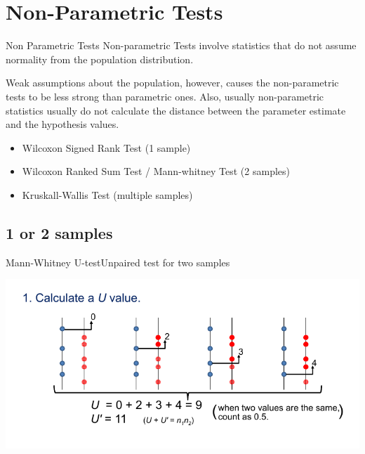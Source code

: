 \section{Non-Parametric Tests}

\begin{frame}{Non Parametric Tests}{}
  Non-parametric Tests involve statistics that do not assume normality from the population distribution.\bigskip

  Weak assumptions about the population, however, causes the non-parametric tests to be less strong than parametric ones. Also, usually non-parametric statistics usually do not calculate the distance between the parameter estimate and the hypothesis values.
  \bigskip

  \begin{itemize}
    \item Wilcoxon Signed Rank Test (1 sample)
    \item Wilcoxon Ranked Sum Test / Mann-whitney Test (2 samples)
    \item Kruskall-Wallis Test (multiple samples)
  \end{itemize}
\end{frame}


\subsection{1 or 2 samples}


\begin{frame}{Mann-Whitney U-test}{Unpaired test for two samples}
  \begin{center}
    \includegraphics[width=1\textwidth]{../img/MannWhitneyU}
  \end{center}
\end{frame}

